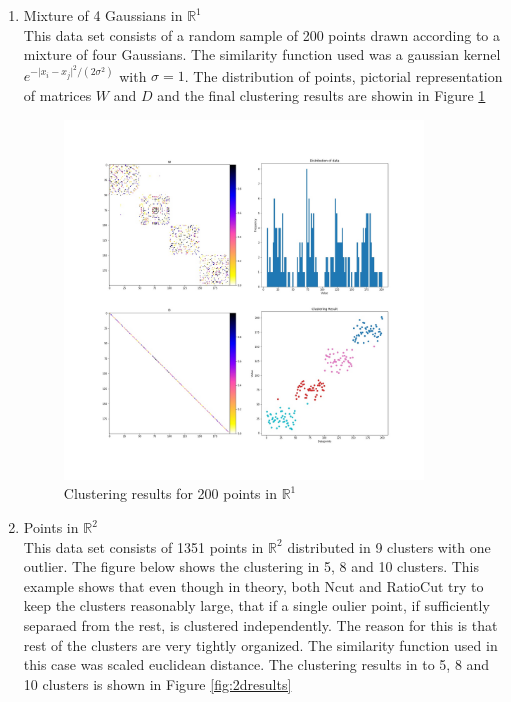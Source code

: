 \documentclass[10pt,a4paper, nocenter]{report}
\newcommand{\abs}[1]{\lvert {#1} \rvert}
\begin{document}
    \begin{enumerate}
        \item{Mixture of 4 Gaussians in $\mathbb{R}^1$}\\
        This data set consists of a random sample of 200 points drawn according to a mixture of four Gaussians. The similarity function used was a gaussian kernel $e^{-\abs{x_i - x_j}^2/(2\sigma^2)}$ with $\sigma = 1$. The distribution of points, pictorial representation of matrices $W$ and $D$ and the final clustering results are showin in Figure \ref{fig:1dresults}

        \begin{figure}
        \includegraphics[width=0.9\textwidth]{../../1DCluster.jpg}
        \caption{Clustering results for 200 points in $\mathbb{R}^1$}
        \label{fig:1dresults}
        \end{figure}

        \item{Points in $\mathbb{R}^2$}\\
        This data set consists of 1351 points in $\mathbb{R}^2$ distributed in 9 clusters with one outlier. The figure below shows the clustering in 5, 8 and 10 clusters. This example shows that even though in theory, both Ncut and RatioCut try to keep the clusters reasonably large, that if a single oulier point, if sufficiently separaed from the rest, is clustered independently. The reason for this is that rest of the clusters are very tightly organized. The similarity function used in this case was scaled euclidean distance. The clustering results in to 5, 8 and 10 clusters is shown in Figure \ref{fig:2dresults}


\end{enumerate}
\end{document}
